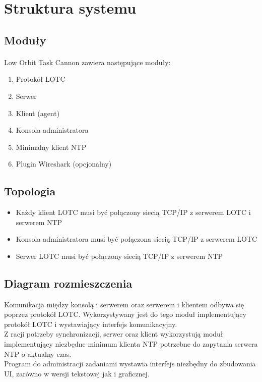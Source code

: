 \documentclass[10pt,a4paper]{article}
\begin{document}
	\section{Struktura systemu}
	
	    \subsection{Moduły}	
	        \paragraph{}
		    Low Orbit Task Cannon zawiera następujące moduły:
		
			\begin{enumerate}
		        \item Protokół LOTC
		        \item Serwer
		        \item Klient (agent)
		        \item Konsola administratora
		        \item Minimalny klient NTP
		        \item Plugin Wireshark (opcjonalny)
		    \end{enumerate}
		    
	    \subsection{Topologia}
	    
		    \begin{itemize}
		        \item Każdy klient LOTC musi być połączony siecią TCP/IP z serwerem LOTC i serwerem NTP 
		        \item Konsola administratora musi być połączona siecią TCP/IP z serwerem LOTC 
		        \item Serwer LOTC musi być połączony siecią TCP/IP z serwerem NTP
		    \end{itemize}
		    
		    \begin{figure}[H]
				\def\svgwidth{\columnwidth}
				
			\end{figure}
			
        \pagebreak			
			
	    \subsection{Diagram rozmieszczenia}
		    Komunikacja między konsolą i serwerem oraz serwerem i klientem odbywa się poprzez protokół LOTC. Wykorzystywany jest do tego moduł implementujący protokół LOTC i wystawiający interfejs komunikacyjny. \\
		    Z racji potrzeby synchronizacji, serwer oraz klient wykorzystują moduł implementujący niezbędne minimum klienta NTP potrzebne do zapytania serwera NTP o aktualny czas. \\
		    Program do administracji zadaniami wystawia interfejs niezbędny do zbudowania UI, zarówno w wersji tekstowej jak i graficznej. \\
		    
\end{document}
